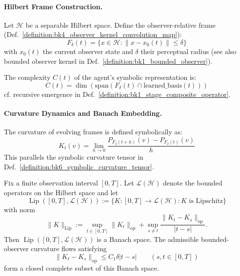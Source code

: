 \paragraph{Hilbert Frame Construction.}
\label{subsec:appC_bounded_frame_dynamics_on_hilbert_manifolds}

\begin{definition}
\label{definition:appC_bounded_observation_frame}
Let $\mathcal{H}$ be a separable Hilbert space. Define the observer-relative frame (Def.~\ref{definition:bk4_observer_kernel_convolution_map}):
\[
F_\delta(t) = \{x \in \mathcal{H} : \|x - x_0(t)\| \leq \delta\}
\]
with $x_0(t)$ the current observer state and $\delta$ their perceptual radius (see also bounded observer kernel in Def.~\ref{definition:bk1_bounded_observer}).
\end{definition}

\begin{definition}
\label{definition:appC_complexity_measure}
The complexity $C(t)$ of the agent’s symbolic representation is:
\[
C(t) = \dim\left(\text{span}(F_\delta(t) \cap \text{learned\_basis}(t))\right)
\]
cf. recursive emergence in Def.~\ref{definition:bk1_stage_composite_operator}.
\end{definition}

\paragraph{Curvature Dynamics and Banach Embedding.}
\label{paragraph:appC_curvature_dynamics_and_banach_embedding}

\begin{definition}
\label{definition:appC_frame_curvature_operator}
The curvature of evolving frames is defined symbolically as:
\[
K_t(v) = \lim_{h \to 0} \frac{P_{F_\delta(t+h)}(v) - P_{F_\delta(t)}(v)}{h}
\]
This parallels the symbolic curvature tensor in Def.~\ref{definition:bk6_symbolic_curvature_tensor}.
\end{definition}

\begin{lemma}
\label{lemma:appC_banach_space_of_curvature_flows}
Fix a finite observation interval $[0,T]$. Let
$\mathcal{L}(\mathcal{H})$ denote the bounded operators on the Hilbert space and
let
\[
\operatorname{Lip}([0,T],\mathcal{L}(\mathcal{H}))
:=\{K:[0,T]\to\mathcal{L}(\mathcal{H}) : K\text{ is Lipschitz}\}
\]
with norm
\[
\|K\|_{\operatorname{Lip}}
:=\sup_{t\in[0,T]}\|K_t\|_{\mathrm{op}}
+\sup_{s\ne t}\frac{\|K_t-K_s\|_{\mathrm{op}}}{|t-s|}.
\]
Then $\operatorname{Lip}([0,T],\mathcal{L}(\mathcal{H}))$ is a Banach space. The
admissible bounded-observer curvature flows satisfying
\[
\|K_t-K_s\|_{\mathrm{op}}\le C_1\delta |t-s|\qquad(s,t\in[0,T])
\]
form a closed complete subset of this Banach space.
\end{lemma}

